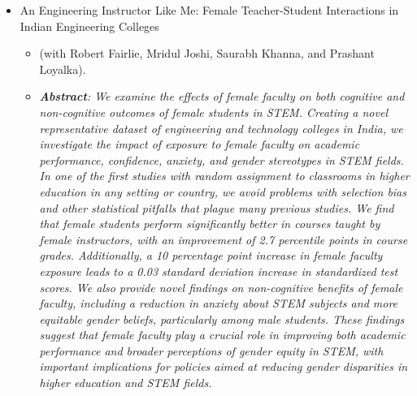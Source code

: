 \documentclass[letter,10pt]{article}
\begin{document}
\begin{itemize}
\begin{itemize}
        \end{itemize}
    \item An Engineering Instructor Like Me: Female Teacher-Student Interactions in Indian Engineering Colleges 
        \begin{itemize}
            \item[] \small{(with Robert Fairlie, Mridul Joshi, Saurabh Khanna, and Prashant Loyalka)}.
            \item \small{\textit{\textbf{Abstract}: We examine the effects of female faculty on both cognitive and non-cognitive outcomes of female students in STEM. Creating a novel representative dataset of engineering and technology colleges in India, we investigate the impact of exposure to female faculty on academic performance, confidence, anxiety, and gender stereotypes in STEM fields. In one of the first studies with random assignment to classrooms in higher education in any setting or country, we avoid problems with selection bias and other statistical pitfalls that plague many previous studies. We find that female students perform significantly better in courses taught by female instructors, with an improvement of 2.7 percentile points in course grades. Additionally, a 10 percentage point increase in female faculty exposure leads to a 0.03 standard deviation increase in standardized test scores. We also provide novel findings on non-cognitive benefits of female faculty, including a reduction in anxiety about STEM subjects and more equitable gender beliefs, particularly among male students. These findings suggest that female faculty play a crucial role in improving both academic performance and broader perceptions of gender equity in STEM, with important implications for policies aimed at reducing gender disparities in higher education and STEM fields.}}
        \end{itemize}
\end{itemize}
\newpage
\end{document}
